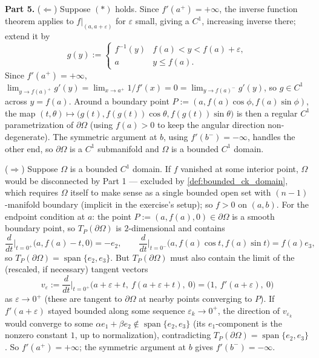 \begin{exercisesolution}
\textbf{Part 5.} ($\Leftarrow$) Suppose $(*)$ holds. Since $f'(a^+)=+\infty$, the inverse
function theorem applies to $f|_{(a,a+\varepsilon)}$ for $\varepsilon$ small, giving a $C^1$,
increasing inverse there; extend it by
\[g(y) := \begin{cases} f^{-1}(y) & f(a)<y<f(a)+\varepsilon, \\ a & y\leq f(a). \end{cases}\]
Since $f'(a^+)=+\infty$, $\lim_{y\to f(a)^+}g'(y) = \lim_{x\to a^+} 1/f'(x) = 0 =
\lim_{y\to f(a)^-}g'(y)$, so $g\in C^1$ across $y=f(a)$. Around a boundary point $P :=
(a,f(a)\cos\phi,f(a)\sin\phi)$, the map $(t,\theta)\mapsto\big(g(t),f(g(t))\cos\theta,
f(g(t))\sin\theta\big)$ is then a regular $C^1$ parametrization of $\partial\Omega$ (using
$f(a)>0$ to keep the angular direction non-degenerate). The symmetric argument at $b$, using
$f'(b^-)=-\infty$, handles the other end, so $\partial\Omega$ is a $C^1$ submanifold and
$\Omega$ is a bounded $C^1$ domain.

($\Rightarrow$) Suppose $\Omega$ is a bounded $C^1$ domain. If $f$ vanished at some interior
point, $\Omega$ would be disconnected by Part 1 --- excluded by \cref{def:bounded_ck_domain},
which requires $\Omega$ itself to make sense as a single bounded open set with $(n-1)$-manifold
boundary (implicit in the exercise's setup); so $f>0$ on $(a,b)$. For the endpoint condition
at $a$: the point $P:=(a,f(a),0)\in\partial\Omega$ is a smooth boundary point, so
$T_P(\partial\Omega)$ is $2$-dimensional and contains
\[\frac{d}{dt}\Big|_{t=0^+}\big(a,f(a)-t,0\big) = -e_2, \qquad
  \frac{d}{dt}\Big|_{t=0^-}\big(a,f(a)\cos t,f(a)\sin t\big) = f(a)e_3,\]
so $T_P(\partial\Omega) = \operatorname{span}\{e_2,e_3\}$. But $T_P(\partial\Omega)$ must
also contain the limit of the (rescaled, if necessary) tangent vectors
\[v_\varepsilon := \frac{d}{dt}\Big|_{t=0^+}\big(a+\varepsilon+t,\ f(a+\varepsilon+t),\
  0\big) = \big(1,\ f'(a+\varepsilon),\ 0\big)\]
as $\varepsilon\to0^+$ (these are tangent to $\partial\Omega$ at nearby points converging to
$P$). If $f'(a+\varepsilon)$ stayed bounded along some sequence $\varepsilon_k\to0^+$, the
direction of $v_{\varepsilon_k}$ would converge to some $\alpha e_1+\beta e_2 \notin
\operatorname{span}\{e_2,e_3\}$ (its $e_1$-component is the nonzero constant $1$, up to
normalization), contradicting $T_P(\partial\Omega)=\operatorname{span}\{e_2,e_3\}$. So
$f'(a^+)=+\infty$; the symmetric argument at $b$ gives $f'(b^-)=-\infty$.
\end{exercisesolution}

